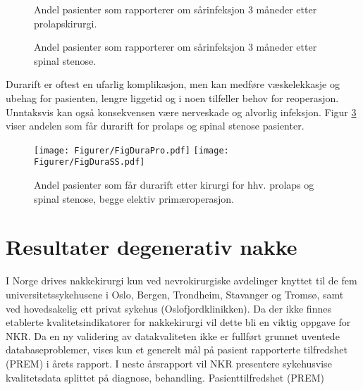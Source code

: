 \documentclass [norsk,a4paper,twoside]{article}\usepackage[]{graphicx}\usepackage[]{color}
\begin{document}
\begin{figure}[ht]
\caption{\label{fig:KpInfAvdPro} Andel pasienter som rapporterer om sårinfeksjon 3 måneder etter
prolapskirurgi.}
\end{figure}

\begin{figure}[ht]
\caption{\label{fig:KpInfAvdSS} Andel pasienter som rapporterer om sårinfeksjon 3 måneder etter
spinal stenose.}
\end{figure}




Durarift er oftest en ufarlig komplikasjon, men kan medføre væskelekkasje og
ubehag for pasienten, lengre liggetid og i noen tilfeller behov for reoperasjon.
Unntaksvis kan også konsekvensen være nerveskade og alvorlig infeksjon. Figur \ref{fig:Dura} viser andelen som får durarift for prolaps og spinal stenose pasienter.

\begin{figure}[ht]
\centering \texttt{[image: Figurer/FigDuraPro.pdf]}
\centering \texttt{[image: Figurer/FigDuraSS.pdf]}
\caption{\label{fig:Dura} Andel pasienter som får durarift etter kirurgi for hhv. prolaps og spinal stenose, begge elektiv primæroperasjon.}
\end{figure}

























\clearpage

\section{Resultater degenerativ nakke}

I Norge drives nakkekirurgi kun ved nevrokirurgiske avdelinger knyttet til de fem
universitetssykehusene i Oslo, Bergen, Trondheim, Stavanger og Tromsø, samt ved
hovedsakelig ett privat sykehus (Oslofjordklinikken).
Da der ikke finnes etablerte kvalitetsindikatorer for nakkekirurgi vil dette bli en
viktig oppgave for NKR. Da en ny validering av datakvaliteten ikke er fullført grunnet
uventede databaseproblemer, vises kun et generelt mål på pasient rapporterte
tilfredshet (PREM) i årets rapport. I neste årsrapport vil NKR presentere sykehusvise
kvalitetsdata splittet på diagnose, behandling.
Pasienttilfredshet (PREM)
\end{document}
